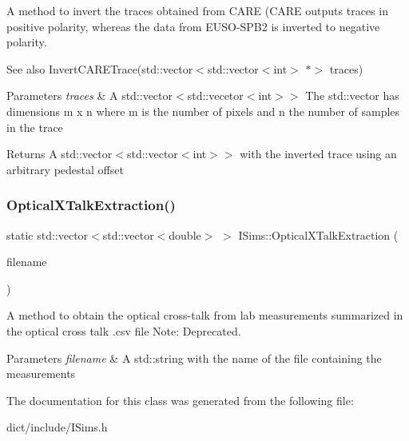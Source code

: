 A method to invert the traces obtained from C\+A\+RE (C\+A\+RE outputs traces in positive polarity, whereas the data from E\+U\+S\+O-\/\+S\+P\+B2 is inverted to negative polarity. 

\begin{DoxySeeAlso}{See also}
Invert\+C\+A\+R\+E\+Trace(std\+::vector$<$std\+::vector$<$int$>$ $\ast$$>$ traces)
\end{DoxySeeAlso}

\begin{DoxyParams}{Parameters}
{\em traces} & A std\+::vector$<$std\+::vecetor$<$int$>$$>$ The std\+::vector has dimensions m x n where m is the number of pixels and n the number of samples in the trace\\
\hline
\end{DoxyParams}
\begin{DoxyReturn}{Returns}
A std\+::vector$<$std\+::vector$<$int$>$$>$ with the inverted trace using an arbitrary pedestal offset 
\end{DoxyReturn}
\mbox{\label{classISims_ae19165760194508b928ad218e2341320}} 
\subsubsection{\texorpdfstring{Optical\+X\+Talk\+Extraction()}{OpticalXTalkExtraction()}}
{\footnotesize\ttfamily static std\+::vector$<$std\+::vector$<$double$>$ $>$ I\+Sims\+::\+Optical\+X\+Talk\+Extraction (\begin{DoxyParamCaption}\item[{std\+::string}]{filename }\end{DoxyParamCaption})\hspace{0.3cm}{\ttfamily [static]}}



A method to obtain the optical cross-\/talk from lab measurements summarized in the optical cross talk .csv file Note\+: Deprecated. 


\begin{DoxyParams}{Parameters}
{\em filename} & A std\+::string with the name of the file containing the measurements \\
\hline
\end{DoxyParams}


The documentation for this class was generated from the following file\+:\begin{DoxyCompactItemize}
\item 
dict/include/I\+Sims.\+h\end{DoxyCompactItemize}
